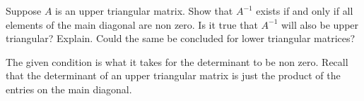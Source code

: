 
\begin{Exercise}[
name={},
title={}, 
difficulty=0,
origin={\cite{KK}}]
Suppose $A$ is an upper triangular matrix. Show that $A^{-1}$ exists
if and only if all elements of the main diagonal are non zero. Is it true
that $A^{-1}$ will also be upper triangular? Explain. Could the same be concluded for lower triangular matrices? 
\end{Exercise}

\begin{Answer}
The given condition is what it takes for the
determinant to be non zero. Recall that the determinant of an upper
triangular matrix is just the product of the entries on the main diagonal.
\end{Answer}
